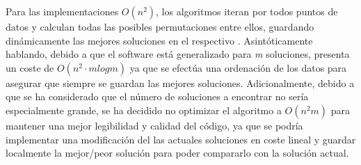 Para las implementaciones $O(n^2)$, los algoritmos iteran por todos puntos de datos y calculan todas las posibles permutaciones entre ellos, guardando dinámicamente las mejores soluciones en el respectivo . Asintóticamente hablando, debido a que el software está generalizado para \textit{m} soluciones, presenta un coste de $O(n^2 · mlogm)$ ya que se efectúa una ordenación de los datos para asegurar que siempre se guardan las mejores soluciones. Adicionalmente, debido a que se ha considerado que el número de soluciones a encontrar no sería especialmente grande, se ha decidido no optimizar el algoritmo a $O(n^2 m)$ para mantener una mejor legibilidad y calidad del código, ya que se podría implementar una modificación del las actuales soluciones en coste lineal  y guardar localmente la mejor/peor solución para poder compararlo con la solución actual.\\

